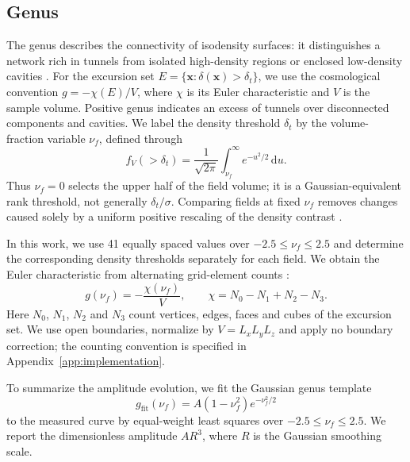 \subsection{Genus}
The genus describes the connectivity of isodensity surfaces: it distinguishes a network rich in tunnels from isolated high-density regions or enclosed low-density cavities \citep{Hamilton1986Topology,Park2005SDSS}. For the excursion set $E=\{\boldsymbol{x}:\delta(\boldsymbol{x})>\delta_t\}$, we use the cosmological convention $g=-\chi(E)/V$, where $\chi$ is its Euler characteristic and $V$ is the sample volume. Positive genus indicates an excess of tunnels over disconnected components and cavities. We label the density threshold $\delta_t$ by the volume-fraction variable $\nu_f$, defined through
\begin{equation}\label{eq:volumefraction}
f_V(>\delta_t)=\frac{1}{\sqrt{2\pi}}\int_{\nu_f}^{\infty}e^{-u^2/2}\,\mathrm{d}u.
\end{equation}
Thus $\nu_f=0$ selects the upper half of the field volume; it is a Gaussian-equivalent rank threshold, not generally $\delta_t/\sigma$. Comparing fields at fixed $\nu_f$ removes changes caused solely by a uniform positive rescaling of the density contrast \citep{Matsubara2003SmoothedFields}.

In this work, we use 41 equally spaced values over $-2.5\le\nu_f\le2.5$ and determine the corresponding density thresholds separately for each field. We obtain the Euler characteristic from alternating grid-element counts \citep{SchmalzingBuchert1997Morphology}:
\begin{equation}
g(\nu_f)=-\frac{\chi(\nu_f)}{V},\qquad \chi=N_0-N_1+N_2-N_3.
\end{equation}
Here $N_0$, $N_1$, $N_2$ and $N_3$ count vertices, edges, faces and cubes of the excursion set. We use open boundaries, normalize by $V=L_xL_yL_z$ and apply no boundary correction; the counting convention is specified in Appendix~\ref{app:implementation}.

To summarize the amplitude evolution, we fit the Gaussian genus template \citep{Matsubara2003SmoothedFields,Wang2012TopologyGravity}
\begin{equation}
g_{\mathrm{fit}}(\nu_f)=A(1-\nu_f^2)e^{-\nu_f^2/2}
\end{equation}
to the measured curve by equal-weight least squares over $-2.5\le\nu_f\le2.5$. We report the dimensionless amplitude $AR^3$, where $R$ is the Gaussian smoothing scale.
